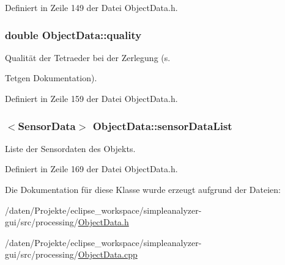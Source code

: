 Definiert in Zeile 149 der Datei Object\-Data.\-h.

\hypertarget{classObjectData_ae047918932000aca3ff1bc680b288c08}{
\subsubsection[{quality}]{\setlength{\rightskip}{0pt plus 5cm}double Object\-Data\-::quality\hspace{0.3cm}{\ttfamily [private]}}}\label{classObjectData_ae047918932000aca3ff1bc680b288c08}


Qualität der Tetraeder bei der Zerlegung (s. 

Tetgen Dokumentation). 

Definiert in Zeile 159 der Datei Object\-Data.\-h.

\hypertarget{classObjectData_af6a1dcb4e137b1698422a912c07c7f39}{
\subsubsection[{sensor\-Data\-List}]{$<${\bf Sensor\-Data}$>$ Object\-Data\-::sensor\-Data\-List\hspace{0.3cm}{\ttfamily [private]}}}\label{classObjectData_af6a1dcb4e137b1698422a912c07c7f39}


Liste der Sensordaten des Objekts. 



Definiert in Zeile 169 der Datei Object\-Data.\-h.



Die Dokumentation für diese Klasse wurde erzeugt aufgrund der Dateien\-:\begin{DoxyCompactItemize}
\item 
/daten/\-Projekte/eclipse\-\_\-workspace/simpleanalyzer-\/gui/src/processing/\hyperlink{ObjectData_8h}{Object\-Data.\-h}\item 
/daten/\-Projekte/eclipse\-\_\-workspace/simpleanalyzer-\/gui/src/processing/\hyperlink{ObjectData_8cpp}{Object\-Data.\-cpp}\end{DoxyCompactItemize}
